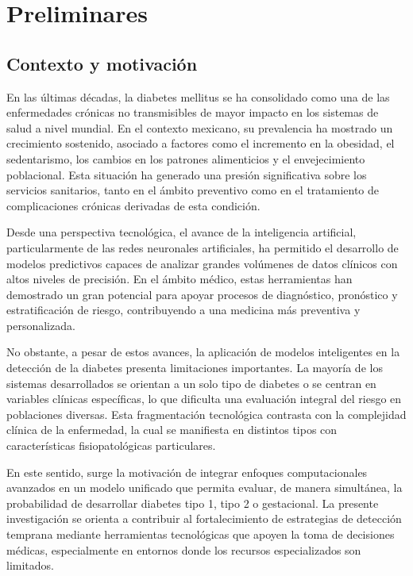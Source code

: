 
\chapter{Preliminares}
\label{capitulo1}
 
\section{Contexto y motivaci\'on}

En las \'ultimas d\'ecadas, la diabetes mellitus se ha consolidado como una de las enfermedades cr\'onicas no transmisibles de mayor impacto en los sistemas de salud a nivel mundial. En el contexto mexicano, su prevalencia ha mostrado un crecimiento sostenido, asociado a factores como el incremento en la obesidad, el sedentarismo, los cambios en los patrones alimenticios y el envejecimiento poblacional. Esta situaci\'on ha generado una presi\'on significativa sobre los servicios sanitarios, tanto en el \'ambito preventivo como en el tratamiento de complicaciones cr\'onicas derivadas de esta condici\'on.

Desde una perspectiva tecnol\'ogica, el avance de la inteligencia artificial, particularmente de las redes neuronales artificiales, ha permitido el desarrollo de modelos predictivos capaces de analizar grandes vol\'umenes de datos cl\'inicos con altos niveles de precisi\'on. En el \'ambito m\'edico, estas herramientas han demostrado un gran potencial para apoyar procesos de diagn\'ostico, pron\'ostico y estratificaci\'on de riesgo, contribuyendo a una medicina m\'as preventiva y personalizada.

No obstante, a pesar de estos avances, la aplicaci\'on de modelos inteligentes en la detecci\'on de la diabetes presenta limitaciones importantes. La mayor\'ia de los sistemas desarrollados se orientan a un solo tipo de diabetes o se centran en variables cl\'inicas espec\'ificas, lo que dificulta una evaluaci\'on integral del riesgo en poblaciones diversas. Esta fragmentaci\'on tecnol\'ogica contrasta con la complejidad cl\'inica de la enfermedad, la cual se manifiesta en distintos tipos con caracter\'isticas fisiopatol\'ogicas particulares.

En este sentido, surge la motivaci\'on de integrar enfoques computacionales avanzados en un modelo unificado que permita evaluar, de manera simult\'anea, la probabilidad de desarrollar diabetes tipo 1, tipo 2 o gestacional. La presente investigaci\'on se orienta a contribuir al fortalecimiento de estrategias de detecci\'on temprana mediante herramientas tecnol\'ogicas que apoyen la toma de decisiones m\'edicas, especialmente en entornos donde los recursos especializados son limitados.

